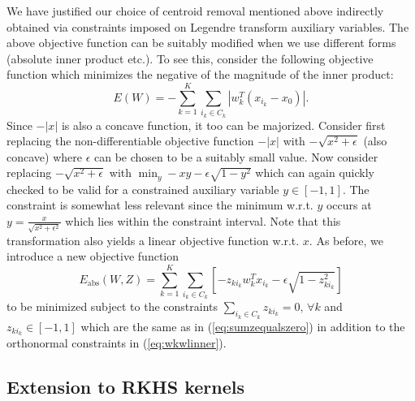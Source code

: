 We have justified our choice of centroid removal mentioned above indirectly
obtained via constraints imposed on Legendre transform auxiliary variables.
The above objective function can be suitably modified when we use
different forms (absolute inner product etc.). To see this, consider
the following objective function which minimizes the negative of the
magnitude of the inner product:
\begin{equation}
E(W)=-\sum_{k=1}^{K}\sum_{i_{k}\in C_{k}}|w_{k}^{T}(x_{i_{k}}-x_{0})|.\label{eq:absvalobj}
\end{equation}
Since $-|x|$ is also a concave function, it too can be majorized.
Consider first replacing the non-differentiable objective function
$-|x|$ with $-\sqrt{x^{2}+\epsilon}$ (also concave) where $\epsilon$
can be chosen to be a suitably small value. Now consider replacing
$-\sqrt{x^{2}+\epsilon}$ with $\min_{y}-xy-\epsilon\sqrt{1-y^{2}}$
which can again quickly checked to be valid for a constrained auxiliary
variable $y\in\left[-1,1\right]$. The constraint is somewhat less
relevant since the minimum w.r.t. $y$ occurs at $y=\frac{x}{\sqrt{x^{2}+\epsilon^{2}}}$
which lies within the constraint interval. Note that this transformation
also yields a linear objective function w.r.t. $x$. As before, we
introduce a new objective function
\begin{equation}
E_{\mathrm{abs}}(W,Z)=\sum_{k=1}^{K}\sum_{i_{k}\in C_{k}}\left[-z_{ki_{k}}w_{k}^{T}x_{i_{k}}-\epsilon\sqrt{1-z_{ki_{k}}^{2}}\right]\label{eq:EWZabs}
\end{equation}
to be minimized subject to the constraints $\sum_{i_{k}\in C_{k}}z_{ki_{k}}=0,\,\forall k$
and $z_{ki_{k}}\in\left[-1,1\right]$ which are the same as in (\ref{eq:sumzequalszero})
in addition to the orthonormal constraints in (\ref{eq:wkwlinner}). 

\subsection{Extension to RKHS kernels}

